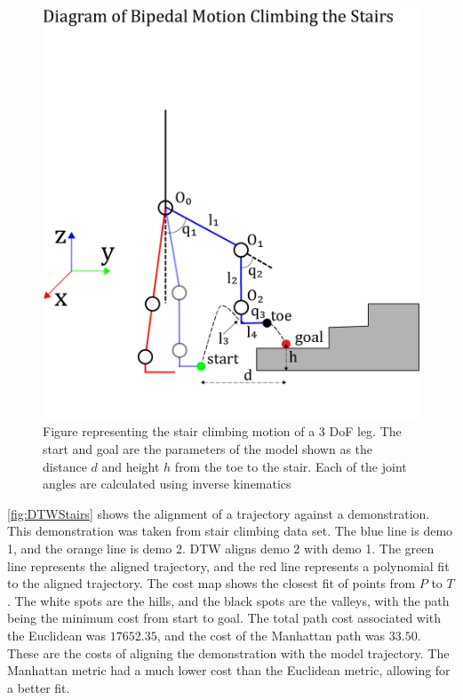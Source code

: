 
\begin{figure}[htb!]
    \centering 
    \includegraphics[scale=0.9]{images/stairs/stick.png}
    \caption[Stair Climbing Motion]{Figure representing the stair climbing motion of a 3 DoF leg. The start and goal are the parameters of the model shown as the distance $d$ and height $h$ from the toe to the stair. Each of the joint angles are calculated using inverse kinematics} 
    \label{fig:stick}
\end{figure} 

\autoref{fig:DTWStairs} shows the alignment of a trajectory against a demonstration. This demonstration was taken from stair climbing data set. The blue line is demo 1, and the orange line is demo 2. DTW aligns demo 2 with demo 1. The green line represents the aligned trajectory, and the red line represents a polynomial fit to the aligned trajectory. The cost map shows the closest fit of points from $P$ to $T$. The white spots are the hills, and the black spots are the valleys, with the path being the minimum cost from start to goal. The total path cost associated with the Euclidean was $17652.35$, and the cost of the Manhattan path was $33.50$. These are the costs of aligning the demonstration with the model trajectory. The Manhattan metric had a much lower cost than the Euclidean metric, allowing for a better fit. 

